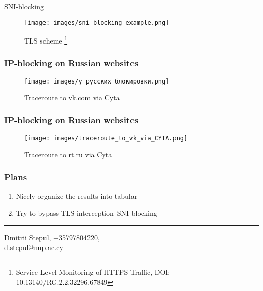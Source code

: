\documentclass[12pt,aspectratio=169,hyperref={pdftex,unicode},xcolor=dvipsnames]{beamer}
\begin{document}
\begin{frame}{SNI-blocking}
    \begin{figure}
        \centering
        \texttt{[image: images/sni\_blocking\_example.png]}
        \caption{TLS scheme \footnote{Service-Level Monitoring of HTTPS Traffic, DOI: 10.13140/RG.2.2.32296.67849}}
        \label{fig:enter-label}
    \end{figure}
\end{frame}


\begin{frame}[fragile]
    \frametitle{IP-blocking on Russian websites}
\begin{figure}
    \centering
    \texttt{[image: images/у русских блокировки.png]}
    \caption{Traceroute to vk.com via Cyta}
    \label{fig:enter-label}
\end{figure}
    \end{frame}



    \begin{frame}[fragile]
    \frametitle{IP-blocking on Russian websites}
    \begin{figure}
        \centering
        \texttt{[image: images/traceroute\_to\_vk\_via\_CYTA.png]}
        \caption{Traceroute to rt.ru via Cyta}
        \label{fig:enter-label}
    \end{figure}
    \end{frame}


    

        
    
  \begin{frame}
        \frametitle{Plans}

        \begin{enumerate}
            \item Nicely organize the results into tabular\graphs 
            \item Try to bypass TLS interception\ SNI-blocking
        \end{enumerate}

        \vspace{5mm}\hrule\vspace{5mm}

        \begin{center}
         Dmitrii Stepul, +35797804220, \\ d.stepul@nup.ac.cy
        \end{center}

    \end{frame}
  
\end{document}
